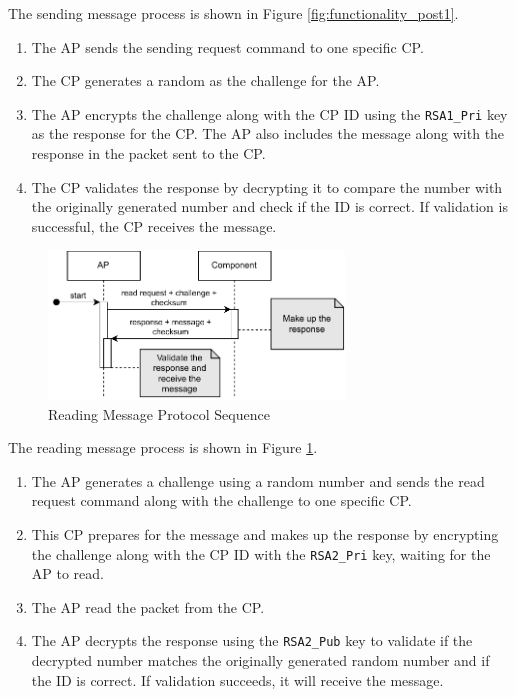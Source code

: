 \documentclass[11pt,oneside,onecolumn,letterpaper]{article}
\begin{document}
	The sending message process is shown in Figure \ref{fig:functionality_post1}.
	\begin{enumerate}
		\item The AP sends the sending request command to one specific CP.
		\item The CP generates a random as the challenge for the AP.
		\item The AP encrypts the challenge along with the CP ID using the \texttt{RSA1\_Pri} key as the response for the CP.
		The AP also includes the message along with the response in the packet sent to the CP.
		\item The CP validates the response by decrypting it to compare the number with the originally generated number and check if the ID is correct.
		If validation is successful,
		the CP receives the message.
	\end{enumerate}
	
	\begin{figure}[h]
		\centering
		\includegraphics[width=0.7\textwidth]{pics/post2.pdf}
		\caption{Reading Message Protocol Sequence}
		\label{fig:functionality_post2}
	\end{figure}
	
	The reading message process is shown in Figure \ref{fig:functionality_post2}.
	\begin{enumerate}
		\item The AP generates a challenge using a random number and sends the read request command along with the challenge to one specific CP.
		\item This CP prepares for the message and makes up the response by encrypting the challenge along with the CP ID with the \texttt{RSA2\_Pri} key,
		waiting for the AP to read.
		\item The AP read the packet from the CP.
		\item The AP decrypts the response using the \texttt{RSA2\_Pub} key to validate if the decrypted number matches the originally generated random number and if the ID is correct.
		If validation succeeds,
		it will receive the message.
	\end{enumerate}
	
\end{document}

